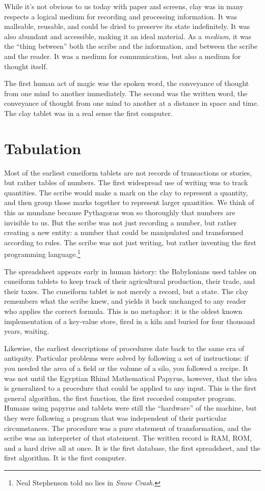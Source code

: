 While it's not obvious to us today with paper and screens, clay was in many respects a logical medium for recording and processing information.  It was malleable, reusable, and could be dried to preserve its state indefinitely.  It was also abundant and accessible, making it an ideal material.  As a \emph{medium}, it was the ``thing between'' both the scribe and the information, and between the scribe and the reader.  It was a medium for communication, but also a medium for thought itself.

The first human act of magic was the spoken word, the conveyance of thought from one mind to another immediately.  The second was the written word, the conveyance of thought from one mind to another at a distance in space and time.  The clay tablet was in a real sense the first computer.

\section{Tabulation}

Most of the earliest cuneiform tablets are not records of transactions or stories, but rather tables of numbers.  The first widespread use of writing was to track quantities.  The scribe would make a mark on the clay to represent a quantity, and then group those marks together to represent larger quantities.  We think of this as mundane because Pythagoras won so thoroughly that numbers are invisible to us.  But the scribe was not just recording a number, but rather creating a new entity:  a number that could be manipulated and transformed according to rules.  The scribe was not just writing, but rather inventing the first programming language.\footnote{Neal Stephenson told no lies in \emph{Snow Crash}.}

The spreadsheet appears early in human history:  the Babylonians used tables on cuneiform tablets to keep track of their agricultural production, their trade, and their taxes.  The cuneiform tablet is not merely a record, but a state.  The clay remembers what the scribe knew, and yields it back unchanged to any reader who applies the correct formula.  This is no metaphor:  it is the oldest known implementation of a key-value store, fired in a kiln and buried for four thousand years, waiting.

Likewise, the earliest descriptions of procedures date back to the same era of antiquity.  Particular problems were solved by following a set of instructions:  if you needed the area of a field or the volume of a silo, you followed a recipe.  It was not until the Egyptian Rhind Mathematical Papyrus, however, that the idea is generalized to a procedure that could be applied to any input.  This is the first general algorithm, the first function, the first recorded computer program.  Humans using papyrus and tablets were still the ``hardware'' of the machine, but they were following a program that was independent of their particular circumstances.  The procedure was a pure statement of transformation, and the scribe was an interpreter of that statement.  The written record is RAM, ROM, and a hard drive all at once.  It is the first database, the first spreadsheet, and the first algorithm.  It is the first computer.

